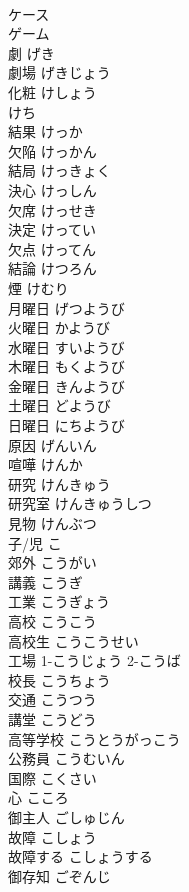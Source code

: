 \documentclass[8pt]{extreport}
\begin{document}
\begin{CJK}{UTF8}{min}
\\	ケース		
\\	ゲーム		
\\	劇	げき	
\\	劇場	げきじょう	
\\	化粧	けしょう	
\\	けち		
\\	結果	けっか	
\\	欠陥	けっかん	
\\	結局	けっきょく	
\\	決心	けっしん	
\\	欠席	けっせき	
\\	決定	けってい	
\\	欠点	けってん	
\\	結論	けつろん	
\\	煙	けむり	
\\	月曜日	げつようび	
\\	火曜日	かようび	
\\	水曜日	すいようび	
\\	木曜日	もくようび	
\\	金曜日	きんようび	
\\	土曜日	どようび	
\\	日曜日	にちようび	
\\	原因	げんいん	
\\	喧嘩	けんか	
\\	研究	けんきゅう	
\\	研究室	けんきゅうしつ	
\\	見物	けんぶつ	
\\	子/児	こ	
\\	郊外	こうがい	
\\	講義	こうぎ	
\\	工業	こうぎょう	
\\	高校	こうこう	
\\	高校生	こうこうせい	
\\	工場	1-こうじょう 2-こうば	
\\	校長	こうちょう	
\\	交通	こうつう	
\\	講堂	こうどう	
\\	高等学校	こうとうがっこう	
\\	公務員	こうむいん	
\\	国際	こくさい	
\\	心	こころ	
\\	御主人	ごしゅじん	
\\	故障	こしょう	
\\	故障する	こしょうする	
\\	御存知	ごぞんじ	

\end{CJK}
\end{document}
